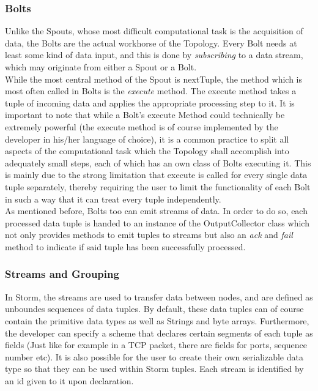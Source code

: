 \documentclass[12pt,a4paper]{article}
\begin{document}
\subsubsection{Bolts}

Unlike the Spouts, whose most difficult computational task is the acquisition of data, the Bolts are the actual workhorse of the Topology. Every Bolt needs at least some kind of data input, and this is done by \textit{subscribing} to a data stream, which may originate from either a Spout or a Bolt.\\

While the most central method of the Spout is nextTuple, the method which is most often called in Bolts is the \textit{execute} method. The execute method takes a tuple of incoming data and applies the appropriate processing step to it. It is important to note that while a Bolt's execute Method could technically be extremely powerful (the execute method is of course implemented by the developer in his/her language of choice), it is a common practice to split all aspects of the computational task which the Topology shall accomplish into adequately small steps, each of which has an own class of Bolts executing it. This is mainly due to the strong limitation that execute is called for every single data tuple separately, thereby requiring the user to limit the functionality of each Bolt in such a way that it can treat every tuple independently.\\

As mentioned before, Bolts too can emit streams of data. In order to do so, each processed data tuple is handed to an instance of the OutputCollector class which not only provides methods to emit tuples to streams but also an \textit{ack} and \textit{fail} method to indicate if said tuple has been successfully processed.

\subsubsection{Streams and Grouping}

In Storm, the streams are used to transfer data between nodes, and are defined as unboundes sequences of data tuples. By default, these data tuples can of course contain the primitive data types as well as Strings and byte arrays. Furthermore, the developer can specify a scheme that declares certain segments of each tuple as fields (Just like for example in a TCP packet, there are fields for ports, sequence number etc). It is also possible for the user to create their own serializable data type so that they can be used within Storm tuples. Each stream is identified by an id given to it upon declaration.\\
\end{document}

